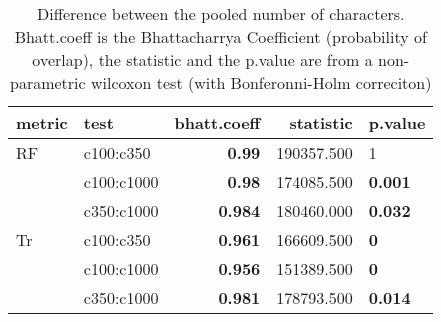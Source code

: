 \begin{table}[ht]
\centering
\begin{tabular}{llr|rl}
  \hline
metric & test & bhatt.coeff & statistic & p.value \\ 
  \hline
RF & c100:c350 & \textbf{0.99} & 190357.500 & 1 \\ 
   & c100:c1000 & \textbf{0.98} & 174085.500 & \textbf{0.001} \\ 
   & c350:c1000 & \textbf{0.984} & 180460.000 & \textbf{0.032} \\ 
  Tr & c100:c350 & \textbf{0.961} & 166609.500 & \textbf{0} \\ 
   & c100:c1000 & \textbf{0.956} & 151389.500 & \textbf{0} \\ 
   & c350:c1000 & \textbf{0.981} & 178793.500 & \textbf{0.014} \\ 
   \hline
\end{tabular}
\caption{Difference between the pooled number of characters. Bhatt.coeff is the Bhattacharrya Coefficient (probability of overlap), the statistic and the p.value are from a non-parametric wilcoxon test (with Bonferonni-Holm correciton)} 
\label{Tab_pooledscharacters_test}
\end{table}
